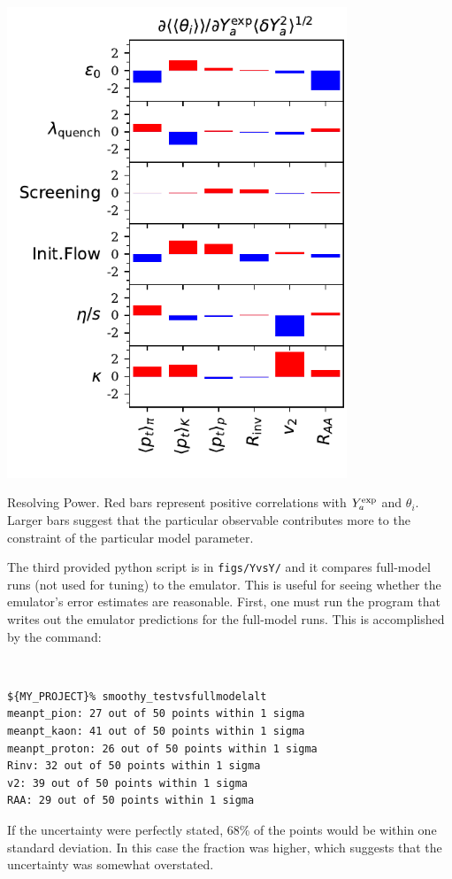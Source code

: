 \documentclass[UserManual.tex]{subfiles}
\begin{document}
\parbox{4.0in}{\centerline{\includegraphics[width=4.0in]{figs/RP_rhic.pdf}}}
\parbox{2.5in}{Resolving Power. Red bars represent positive correlations with $Y^{\rm exp}_a$ and $\theta_i$. Larger bars suggest that the particular observable contributes more to the constraint of the particular model parameter.}

The third provided python script is in {\tt figs/YvsY/} and it compares full-model runs (not used for tuning) to the emulator. This is useful for seeing whether the emulator's error estimates are reasonable. First, one must run the program that writes out the emulator predictions for the full-model runs. This is accomplished by the command:
{\tt
\begin{verbatim}
${MY_PROJECT}% smoothy_testvsfullmodelalt
meanpt_pion: 27 out of 50 points within 1 sigma
meanpt_kaon: 41 out of 50 points within 1 sigma
meanpt_proton: 26 out of 50 points within 1 sigma
Rinv: 32 out of 50 points within 1 sigma
v2: 39 out of 50 points within 1 sigma
RAA: 29 out of 50 points within 1 sigma
\end{verbatim}}
If the uncertainty were perfectly stated, 68\% of the points would be within one standard deviation. In this case the fraction was higher, which suggests that the uncertainty was somewhat overstated.
\end{document}
